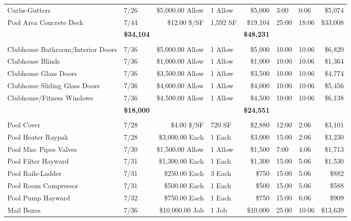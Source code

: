 \documentclass[11pt,letterpaper]{article}
\begin{document}
\begin{longtable}{p{5.1cm} p{1.6cm} r p{1.7cm} r p{1.0cm} p{1.2cm} r}
Curbs-Gutters & 7/26 & \$5,000.00 Allow & 1 Allow & \$5,000 & 3:00 & 0:06 & \$5,074 \\
\rowcolor{blue!12} Pool Area Concrete Deck & 7/44 & \$12.00 \$/SF & 1,592 SF & \$19,104 & 25:00 & 18:06 & \$33,008 \\
\addlinespace[1pt] \multicolumn{4}{r}{} & \textbf{\$34,104} & & & \textbf{\$48,231} \\
\addlinespace[6pt]
\multicolumn{8}{l}{\textbf{Doors-Windows}} \\
\rowcolor{blue!12} Clubhouse Bathroom/Interior Doors & 7/36 & \$5,000.00 Allow & 1 Allow & \$5,000 & 10:00 & 10:06 & \$6,820 \\
Clubhouse Blinds & 7/36 & \$1,000.00 Allow & 1 Allow & \$1,000 & 10:00 & 10:06 & \$1,364 \\
\rowcolor{blue!12} Clubhouse Glass Doors & 7/36 & \$3,500.00 Allow & 1 Allow & \$3,500 & 10:00 & 10:06 & \$4,774 \\
Clubhouse Sliding Glass Doors & 7/36 & \$4,000.00 Allow & 1 Allow & \$4,000 & 10:00 & 10:06 & \$5,456 \\
\rowcolor{blue!12} Clubhouse/Fitness Windows & 7/36 & \$4,500.00 Allow & 1 Allow & \$4,500 & 10:00 & 10:06 & \$6,138 \\
\addlinespace[1pt] \multicolumn{4}{r}{} & \textbf{\$18,000} & & & \textbf{\$24,551} \\
\addlinespace[6pt]
\multicolumn{8}{l}{\textbf{Equipment}} \\
\rowcolor{blue!12} Pool Cover & 7/28 & \$4.00 \$/SF & 720 SF & \$2,880 & 12:00 & 2:06 & \$3,101 \\
Pool Heater Raypak & 7/28 & \$3,000.00 Each & 1 Each & \$3,000 & 15:00 & 2:06 & \$3,230 \\
\rowcolor{blue!12} Pool Misc Pipes Valves & 7/30 & \$1,500.00 Allow & 1 Allow & \$1,500 & 7:00 & 4:06 & \$1,713 \\
Pool Filter Hayward & 7/31 & \$1,300.00 Each & 1 Each & \$1,300 & 15:00 & 5:06 & \$1,530 \\
\rowcolor{blue!12} Pool Rails-Ladder & 7/31 & \$250.00 Each & 3 Each & \$750 & 15:00 & 5:06 & \$882 \\
Pool Room Compressor & 7/31 & \$500.00 Each & 1 Each & \$500 & 15:00 & 5:06 & \$588 \\
\rowcolor{blue!12} Pool Pump Hayward & 7/32 & \$750.00 Each & 1 Each & \$750 & 15:00 & 6:06 & \$909 \\
Mail Boxes & 7/36 & \$10,000.00 Job & 1 Job & \$10,000 & 25:00 & 10:06 & \$13,639 \\

\end{longtable}
\end{document}
